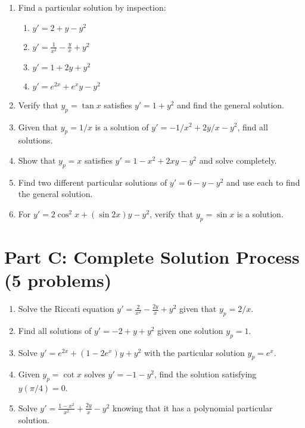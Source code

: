 \documentclass[12pt]{article}
\begin{document}
\begin{enumerate}[resume]
    \item Find a particular solution by inspection:
    \begin{enumerate}[label=(\alph*)]
        \item $y' = 2 + y - y^2$
        \item $y' = \frac{1}{x^2} - \frac{y}{x} + y^2$
        \item $y' = 1 + 2y + y^2$
        \item $y' = e^{2x} + e^x y - y^2$
    \end{enumerate}

    \item Verify that $y_p = \tan x$ satisfies $y' = 1 + y^2$ and find the general solution.

    \item Given that $y_p = 1/x$ is a solution of $y' = -1/x^2 + 2y/x - y^2$, find all solutions.

    \item Show that $y_p = x$ satisfies $y' = 1 - x^2 + 2xy - y^2$ and solve completely.

    \item Find two different particular solutions of $y' = 6 - y - y^2$ and use each to find the general solution.

    \item For $y' = 2\cos^2 x + (\sin 2x)y - y^2$, verify that $y_p = \sin x$ is a solution.
\end{enumerate}

\section*{Part C: Complete Solution Process (5 problems)}

\begin{enumerate}[resume]
    \item Solve the Riccati equation $y' = \frac{2}{x^2} - \frac{2y}{x} + y^2$ given that $y_p = 2/x$.

    \item Find all solutions of $y' = -2 + y + y^2$ given one solution $y_p = 1$.

    \item Solve $y' = e^{2x} + (1 - 2e^x)y + y^2$ with the particular solution $y_p = e^x$.

    \item Given $y_p = \cot x$ solves $y' = -1 - y^2$, find the solution satisfying $y(\pi/4) = 0$.

    \item Solve $y' = \frac{1 - x^2}{x^2} + \frac{2y}{x} - y^2$ knowing that it has a polynomial particular solution.
\end{enumerate}
\end{document}
